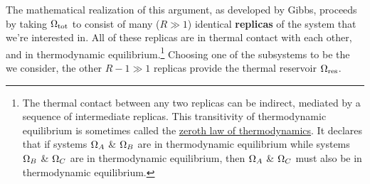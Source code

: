 The mathematical realization of this argument, as developed by Gibbs, proceeds by taking $\Omega_{\text{tot}}$ to consist of many ($R \gg 1$) identical \textbf{replicas} of the system \Om that we're interested in.
All of these replicas are in thermal contact with each other, and in thermodynamic equilibrium.\footnote{The thermal contact between any two replicas can be indirect, mediated by a sequence of intermediate replicas.  This transitivity of thermodynamic equilibrium is sometimes called the \href{https://en.wikipedia.org/wiki/Zeroth_law_of_thermodynamics}{zeroth law of thermodynamics}.  It declares that if systems $\Omega_A$ \& $\Omega_B$ are in thermodynamic equilibrium while systems $\Omega_B$ \& $\Omega_C$ are in thermodynamic equilibrium, then $\Omega_A$ \& $\Omega_C$ must also be in thermodynamic equilibrium.}
Choosing one of the subsystems to be the \Om we consider, the other $R - 1 \gg 1$ replicas provide the thermal reservoir $\Omega_{\text{res}}$.

